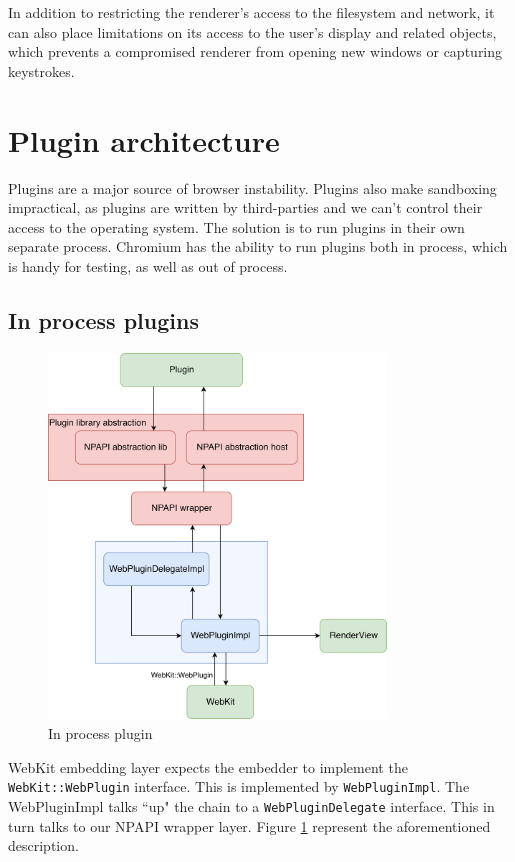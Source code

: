 In addition to restricting the renderer's access to the filesystem and network, it can also place limitations on its access to the user's display and related objects, which prevents a compromised renderer from opening new windows or capturing keystrokes. 


\section{Plugin architecture} 
\label{sec:plugin}

Plugins are a major source of browser instability. Plugins also make sandboxing impractical, as plugins are written by third-parties and we can't control their access to the operating system. The solution is to run plugins in their own separate process. Chromium has the ability to run plugins both in process, which is handy for testing, as well as out of process. 
\subsection{In process plugins}
\begin{figure}[H]
    \centering
    \includegraphics[width=0.8\textwidth]{img/in.png}
    \caption{In process plugin}
    \label{fig:in}
\end{figure}

WebKit embedding layer expects the embedder to implement the \texttt{WebKit::WebPlugin} interface. This is implemented by \texttt{WebPluginImpl}. The WebPluginImpl talks ``up" the chain to a \texttt{WebPluginDelegate} interface. This in turn talks to our NPAPI wrapper layer. Figure \ref{fig:in} represent the aforementioned description.

